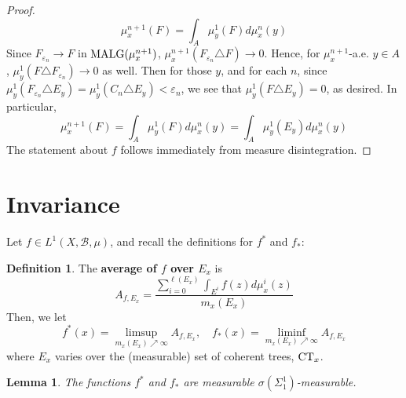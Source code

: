 \documentclass{article}
\newcommand{\malg}[1]{\textmd{MALG}(#1)}
\newcommand{\CT}{\textmd{CT}}
\newtheorem{lemma}[theorem]{Lemma}
\theoremstyle{definition}
\newtheorem{definition}[theorem]{Definition}
\begin{document}
\begin{proof}
    \[
    \mu_x^{n+1}(F) = \int_A \mu_y^1(F)d\mu_x^n(y)
    \]
    Since $ F_{\varepsilon_n}\rightarrow F $ in $ \malg{\mu_x^{n+1}} $, $ \mu_x^{n+1}(F_{\varepsilon_n}\triangle F)\rightarrow 0 $. Hence, for $ \mu_x^{n+1} $-a.e. $ y\in A $, $ \mu^1_y(F\triangle F_{\varepsilon_n}) \rightarrow 0 $ as well. Then for those $ y $, and for each $ n $, since $ \mu_y^1(F_{\varepsilon_n}\triangle E_y) = \mu_y^1(C_n\triangle E_y) <\varepsilon_n $, we see that $ \mu_y^1(F\triangle E_y) = 0 $, as desired. In particular,
    \[
    \mu_x^{n+1}(F) = \int_A \mu_y^1(F)d\mu_x^n(y) = \int_A \mu_y^1(E_y)d\mu_x^n(y)
    \]
    The statement about $ f$ follows immediately from measure disintegration.
\end{proof}
\section{Invariance}
\noindent Let $ f\in L^1(X,\mathcal{B},\mu) $, and recall the definitions for $ f^* $ and $ f_* $:
\begin{definition}
    The \textbf{average of $ f $ over $ E_x $} is
\[
A_{f,E_x} = \frac{\sum_{i=0}^{\ell(E_x)} \int_{E^i}f(z)d\mu^i_x(z)}{m_x(E_x)}
\]
Then, we let
\[
f^*(x) = \limsup_{m_x(E_x)\nearrow \infty} A_{f,E_x},\quad f_*(x) = \liminf_{m_x(E_x)\nearrow \infty} A_{f,E_x}
\]
where $ E_x $ varies over the (measurable) set of coherent trees, $ \CT_x $.
\end{definition}
\begin{lemma}
    The functions $ f^* $ and $ f_* $ are measurable $ \sigma(\Sigma^1_1) $-measurable. 
\end{lemma}
\end{document}
